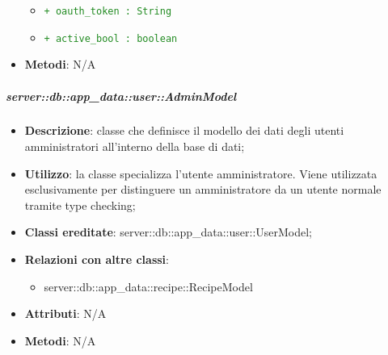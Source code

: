 \begin{itemize}
\begin{itemize}
\begin{description}
						\end{description}
						\item \textcolor{forestgreen}{\texttt{+ oauth\_token : String}}
						\item \textcolor{forestgreen}{\texttt{+ active\_bool : boolean}}
					\end{itemize}
				\item \textbf{Metodi}: N/A
			\end{itemize}


		\subparagraph{server::db::app\_data::user::AdminModel} %
		\label{subp:server_db_app_data_user_admin_model}
			\begin{itemize}
				\item \textbf{Descrizione}: classe che definisce il modello dei dati degli utenti amministratori all'interno della base di dati;
				\item \textbf{Utilizzo}: la classe specializza l'utente amministratore. Viene utilizzata esclusivamente per distinguere un amministratore da un utente normale tramite type checking;
				\item \textbf{Classi ereditate}: server::db::app\_data::user::UserModel;
				\item \textbf{Relazioni con altre classi}:
					\begin{itemize}
						\item server::db::app\_data::recipe::RecipeModel
					\end{itemize}
				\item \textbf{Attributi}: N/A
				\item \textbf{Metodi}: N/A
			\end{itemize}


